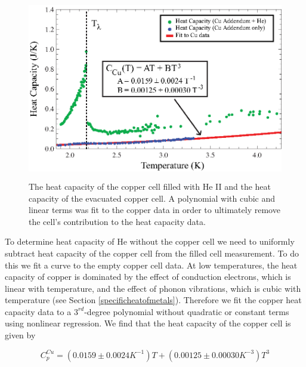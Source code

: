 \begin{figure}[htbp]
\begin{center}
\includegraphics[height=80mm]{./figures/lambdanorm.eps}
\caption{\small{The heat capacity of the copper cell filled with He II and the heat capacity of the evacuated copper cell.  A polynomial with cubic and linear terms was fit to the copper data in order to ultimately remove the cell's contribution to the heat capacity data.}}
\label{fig:lambdanorm}
\end{center}
\end{figure}

To determine heat capacity of He without the copper cell we need to uniformly subtract heat capacity of the copper cell from the filled cell measurement.  To do this we fit a curve to the empty copper cell data.  At low temperatures, the heat capacity of copper is dominated by the effect of conduction electrons, which is linear with temperature, and the effect of phonon vibrations, which is cubic with temperature (see Section \ref{specificheatofmetals}).  Therefore we fit the copper heat capacity data to a $3^{rd}$-degree polynomial without  quadratic or constant terms using nonlinear regression.  We find that the heat capacity of the copper cell is given by

\begin{center}
\begin{equation}\label{eq:cufit}
C^{Cu}_{p} =( 0.0159\pm0.0024 K^{-1}) T + (0.00125\pm0.00030 K^{-3}) T^{3} 
\end{equation}
\end{center}

